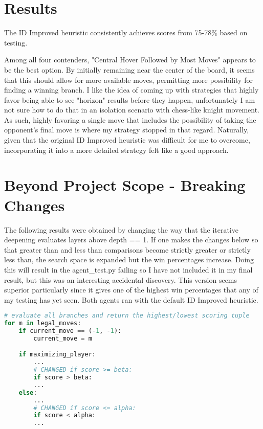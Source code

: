 \documentclass[10pt, a4paper]{article}
\begin{document}
\section{Results}

The ID Improved heuristic consistently achieves scores from 75-78\% based on testing.

Among all four contenders, "Central Hover Followed by Most Moves" appears to be the best option.
By initially remaining near the center of the board, it seems
that this should allow for more available moves, permitting more possibility for finding a winning branch.
I like the idea of coming up with strategies that highly favor being able to see "horizon" results 
before they happen, unfortunately I am not sure how to do that in an isolation scenario with chess-like knight movement.
As such, highly favoring a single move that includes the possibility of taking the opponent's final move
is where my strategy stopped in that regard.  Naturally, given that the original ID Improved heuristic
was difficult for me to overcome, incorporating it into a more detailed strategy felt like a good approach.

\section{Beyond Project Scope - Breaking Changes}

The following results were obtained by changing the way that the iterative deepening
evaluates layers above depth == 1.  If one makes the changes below so that greater than and
less than comparisons become strictly greater or strictly less than, the search space is
expanded but the win percentages increase.  Doing this will result in the agent\_test.py
failing so I have not included it in my final result, but this was an interesting accidental
discovery.  This version seems superior particularly since it gives one of the highest win percentages
that any of my testing has yet seen.  Both agents ran with the default ID Improved heuristic.

\begin{lstlisting}[language=Python]
# evaluate all branches and return the highest/lowest scoring tuple
for m in legal_moves:
	if current_move == (-1, -1):
		current_move = m

	if maximizing_player:
		...
		# CHANGED if score >= beta:
		if score > beta:
		...
	else:	
		...
		# CHANGED if score <= alpha:
		if score < alpha:
		...
\end{lstlisting}
\end{document}
